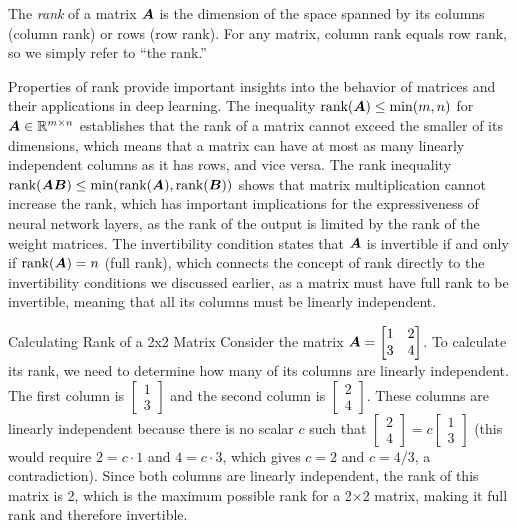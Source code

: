 \begin{definition}[Rank]
The \emph{rank} of a matrix $\boldsymbol{A}$ is the dimension of the space spanned by its columns (column rank) or rows (row rank). For any matrix, column rank equals row rank, so we simply refer to ``the rank.''
\end{definition}

Properties of rank provide important insights into the behavior of matrices and their applications in deep learning. The inequality $\text{rank}(\boldsymbol{A}) \leq \min(m, n)$ for $\boldsymbol{A} \in \mathbb{R}^{m \times n}$ establishes that the rank of a matrix cannot exceed the smaller of its dimensions, which means that a matrix can have at most as many linearly independent columns as it has rows, and vice versa. The rank inequality $\text{rank}(\boldsymbol{AB}) \leq \min(\text{rank}(\boldsymbol{A}), \text{rank}(\boldsymbol{B}))$ shows that matrix multiplication cannot increase the rank, which has important implications for the expressiveness of neural network layers, as the rank of the output is limited by the rank of the weight matrices. The invertibility condition states that $\boldsymbol{A}$ is invertible if and only if $\text{rank}(\boldsymbol{A}) = n$ (full rank), which connects the concept of rank directly to the invertibility conditions we discussed earlier, as a matrix must have full rank to be invertible, meaning that all its columns must be linearly independent.

\begin{examplebox}{Calculating Rank of a 2x2 Matrix}
Consider the matrix $\boldsymbol{A} = \begin{bmatrix} 1 & 2 \\ 3 & 4 \end{bmatrix}$. To calculate its rank, we need to determine how many of its columns are linearly independent. The first column is $\begin{bmatrix} 1 \\ 3 \end{bmatrix}$ and the second column is $\begin{bmatrix} 2 \\ 4 \end{bmatrix}$. These columns are linearly independent because there is no scalar $c$ such that $\begin{bmatrix} 2 \\ 4 \end{bmatrix} = c\begin{bmatrix} 1 \\ 3 \end{bmatrix}$ (this would require $2 = c \cdot 1$ and $4 = c \cdot 3$, which gives $c = 2$ and $c = 4/3$, a contradiction). Since both columns are linearly independent, the rank of this matrix is 2, which is the maximum possible rank for a 2×2 matrix, making it full rank and therefore invertible.
\end{examplebox}

